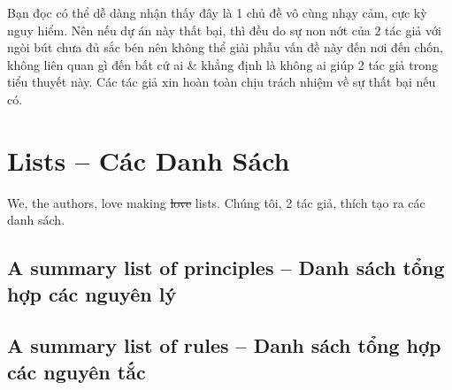 \documentclass[12pt]{article}
\begin{document}
Bạn đọc có thể dễ dàng nhận thấy đây là 1 chủ đề vô cùng nhạy cảm, cực kỳ nguy hiểm. Nên nếu dự án này thất bại, thì đều do sự non nớt của 2 tác giả với ngòi bút chưa đủ sắc bén nên không thể giải phẫu vấn đề này đến nơi đến chốn, không liên quan gì đến bất cứ ai \& khẳng định là không ai giúp 2 tác giả trong tiểu thuyết này. Các tác giả xin hoàn toàn chịu trách nhiệm về sự thất bại nếu có.


\section{Lists -- Các Danh Sách}
We, the authors, love making \st{love} lists. Chúng tôi, 2 tác giả, thích tạo ra các danh sách.

\subsection{A summary list of principles -- Danh sách tổng hợp các nguyên lý}

\subsection{A summary list of rules -- Danh sách tổng hợp các nguyên tắc}
\end{document}
